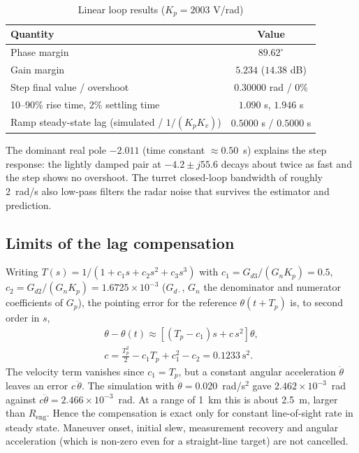 \documentclass[conference]{IEEEtran}
\newcommand{\Tp}{T_p}
\newcommand{\Kp}{K_p}
\newcommand{\Kv}{K_v}
\begin{document}
\begin{table}[t]
\caption{Linear loop results ($\Kp=2003$ V/rad)}
\label{tab:lin}
\centering\footnotesize
\begin{tabular}{lc}
\toprule
Quantity & Value\\
\midrule
Phase margin & $89.62^\circ$\\
Gain margin & $5.234$ ($14.38$ dB)\\
Step final value / overshoot & $0.30000$ rad / $0\%$\\
10--90\% rise time, 2\% settling time & $1.090$ s, $1.946$ s\\
Ramp steady-state lag (simulated / $1/(\Kp\Kv)$) & $0.5000$ s / $0.5000$ s\\
\bottomrule
\end{tabular}
\end{table}

The dominant real pole $-2.011$ (time constant $\approx0.50$~s) explains the step response: the lightly damped pair at $-4.2\pm j55.6$ decays about twice as fast and the step shows no overshoot. The turret closed-loop bandwidth of roughly 2~rad/s also low-pass filters the radar noise that survives the estimator and prediction.

\subsection{Limits of the lag compensation}

Writing $T(s)=1/(1+c_1s+c_2s^2+c_3s^3)$ with $c_1=G_{d3}/(G_{n}\Kp)=0.5$, $c_2=G_{d2}/(G_n\Kp)=1.6725\times10^{-3}$ ($G_{d\cdot}$, $G_n$ the denominator and numerator coefficients of $G_p$), the pointing error for the reference $\theta(t+\Tp)$ is, to second order in $s$,
\begin{equation}
\begin{gathered}
\theta-\theta(t)\approx\left[(\Tp-c_1)s+c\,s^2\right]\theta,\\
c=\tfrac{\Tp^2}{2}-c_1\Tp+c_1^2-c_2=0.1233\ \mathrm{s^2}.
\end{gathered}
\end{equation}
The velocity term vanishes since $c_1=\Tp$, but a constant angular acceleration $\ddot\theta$ leaves an error $c\,\ddot\theta$. The simulation with $\ddot\theta=0.020$~rad/s$^2$ gave $2.462\times10^{-3}$~rad against $c\ddot\theta=2.466\times10^{-3}$~rad. At a range of 1~km this is about 2.5~m, larger than $R_\mathrm{eng}$. Hence the compensation is exact only for constant line-of-sight rate in steady state. Maneuver onset, initial slew, measurement recovery and angular acceleration (which is non-zero even for a straight-line target) are not cancelled.
\end{document}
